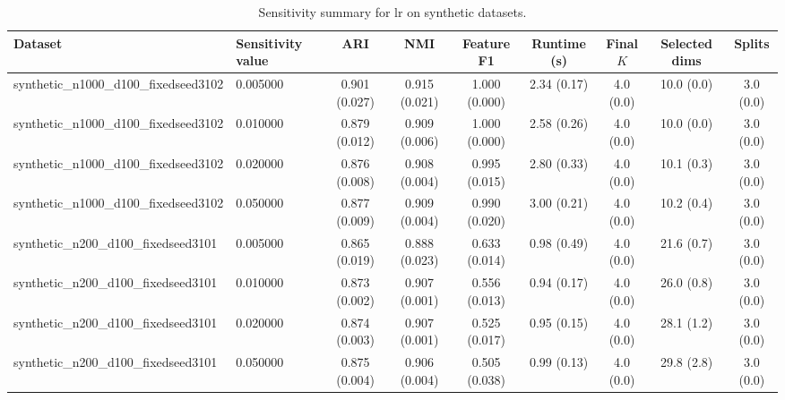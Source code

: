 \begin{table}[t]
\centering
\caption{Sensitivity summary for lr on synthetic datasets.}
\label{tab:sens-lr-synthetic}
\begin{tabular}{llccccccc}
\toprule
Dataset & Sensitivity value & ARI & NMI & Feature F1 & Runtime (s) & Final $K$ & Selected dims & Splits \\
\midrule
synthetic_n1000_d100_fixedseed3102 & 0.005000 & 0.901 (0.027) & 0.915 (0.021) & 1.000 (0.000) & 2.34 (0.17) & 4.0 (0.0) & 10.0 (0.0) & 3.0 (0.0) \\
synthetic_n1000_d100_fixedseed3102 & 0.010000 & 0.879 (0.012) & 0.909 (0.006) & 1.000 (0.000) & 2.58 (0.26) & 4.0 (0.0) & 10.0 (0.0) & 3.0 (0.0) \\
synthetic_n1000_d100_fixedseed3102 & 0.020000 & 0.876 (0.008) & 0.908 (0.004) & 0.995 (0.015) & 2.80 (0.33) & 4.0 (0.0) & 10.1 (0.3) & 3.0 (0.0) \\
synthetic_n1000_d100_fixedseed3102 & 0.050000 & 0.877 (0.009) & 0.909 (0.004) & 0.990 (0.020) & 3.00 (0.21) & 4.0 (0.0) & 10.2 (0.4) & 3.0 (0.0) \\
synthetic_n200_d100_fixedseed3101 & 0.005000 & 0.865 (0.019) & 0.888 (0.023) & 0.633 (0.014) & 0.98 (0.49) & 4.0 (0.0) & 21.6 (0.7) & 3.0 (0.0) \\
synthetic_n200_d100_fixedseed3101 & 0.010000 & 0.873 (0.002) & 0.907 (0.001) & 0.556 (0.013) & 0.94 (0.17) & 4.0 (0.0) & 26.0 (0.8) & 3.0 (0.0) \\
synthetic_n200_d100_fixedseed3101 & 0.020000 & 0.874 (0.003) & 0.907 (0.001) & 0.525 (0.017) & 0.95 (0.15) & 4.0 (0.0) & 28.1 (1.2) & 3.0 (0.0) \\
synthetic_n200_d100_fixedseed3101 & 0.050000 & 0.875 (0.004) & 0.906 (0.004) & 0.505 (0.038) & 0.99 (0.13) & 4.0 (0.0) & 29.8 (2.8) & 3.0 (0.0) \\
\bottomrule
\end{tabular}
\end{table}
